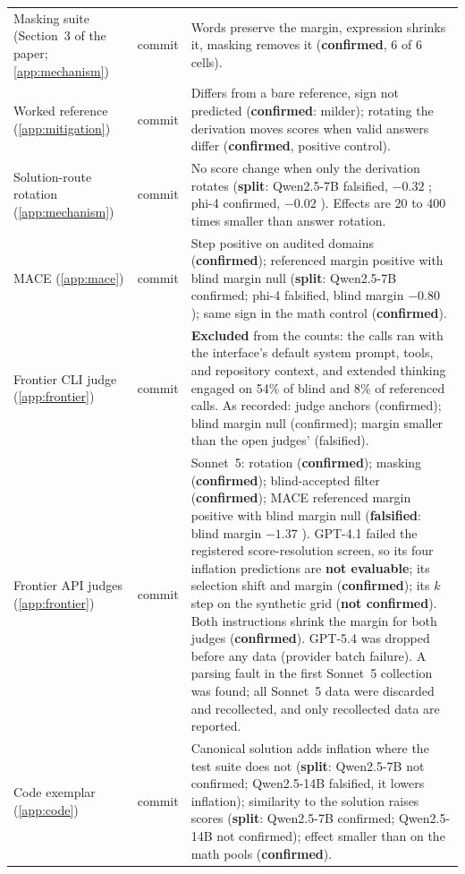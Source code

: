 {\begin{longtable}{L{3.2cm}L{1.1cm}L{8.7cm}}
Masking suite (Section~3 of the paper; \cref{app:mechanism}) & commit & Words preserve the margin, expression shrinks it, masking removes it (\textbf{confirmed}, 6 of 6 cells). \\
Worked reference (\cref{app:mitigation}) & commit & Differs from a bare reference, sign not predicted (\textbf{confirmed}: milder); rotating the derivation moves scores when valid answers differ (\textbf{confirmed}, positive control). \\
Solution-route rotation (\cref{app:mechanism}) & commit & No score change when only the derivation rotates (\textbf{split}: Qwen2.5-7B falsified, $-0.32$ ; phi-4 confirmed, $-0.02$ ). Effects are 20 to 400 times smaller than answer rotation. \\
\textsc{MACE} (\cref{app:mace}) & commit & Step positive on audited domains (\textbf{confirmed}); referenced margin positive with blind margin null (\textbf{split}: Qwen2.5-7B confirmed; phi-4 falsified, blind margin $-0.80$ ); same sign in the math control (\textbf{confirmed}). \\
Frontier CLI judge (\cref{app:frontier}) & commit & \textbf{Excluded} from the counts: the calls ran with the interface's default system prompt, tools, and repository context, and extended thinking engaged on 54\% of blind and 8\% of referenced calls. As recorded: judge anchors (confirmed); blind margin null (confirmed); margin smaller than the open judges' (falsified). \\
Frontier API judges (\cref{app:frontier}) & commit & Sonnet~5: rotation (\textbf{confirmed}); masking (\textbf{confirmed}); blind-accepted filter (\textbf{confirmed}); \textsc{MACE} referenced margin positive with blind margin null (\textbf{falsified}: blind margin $-1.37$ ). GPT-4.1 failed the registered score-resolution screen, so its four inflation predictions are \textbf{not evaluable}; its selection shift and margin (\textbf{confirmed}); its $k$ step on the synthetic grid (\textbf{not confirmed}). Both instructions shrink the margin for both judges (\textbf{confirmed}). GPT-5.4 was dropped before any data (provider batch failure). A parsing fault in the first Sonnet~5 collection was found; all Sonnet~5 data were discarded and recollected, and only recollected data are reported. \\
Code exemplar (\cref{app:code}) & commit & Canonical solution adds inflation where the test suite does not (\textbf{split}: Qwen2.5-7B not confirmed; Qwen2.5-14B falsified, it lowers inflation); similarity to the solution raises scores (\textbf{split}: Qwen2.5-7B confirmed; Qwen2.5-14B not confirmed); effect smaller than on the math pools (\textbf{confirmed}). \\

\end{longtable}}
